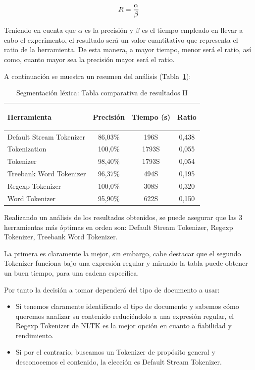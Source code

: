 \documentclass[runningheads,a4paper]{llncs}
\theoremstyle{break}
\newcommand{\rowstyle}[1]{\gdef\currentrowstyle{#1}%
  #1\ignorespaces
}
\begin{document}
\[\large R = \frac{\alpha}{\beta }\]

Teniendo en cuenta que $\alpha$ es la precisión y $\beta$ es el tiempo empleado en llevar a cabo el experimento, el resultado será un valor cuantitativo que representa el ratio de la herramienta. De esta manera, a mayor tiempo, menor será el ratio, así como, cuanto mayor sea la precisión mayor será el ratio.

A continuación se muestra un resumen del análisis (Tabla~\ref{tab:tok}):
\bgroup
\centering
\setlength{\tabcolsep}{12pt}
\def\arraystretch{1.5}
\begin{table}
\begin{center}
\begin{tabular}{p{5cm}| c |c|c}
\rowstyle{\bfseries}
Herramienta & \rowstyle{\bfseries} Precisión & \rowstyle{\bfseries} Tiempo (s) & \rowstyle{\bfseries} Ratio\\ \hline
Default Stream Tokenizer 	& 86,03\% 	&  196S  & 0,438 \\
Tokenization				& 100,0\%	&  1793S & 0,055 \\
Tokenizer  					& 98,40\%	&  1793S & 0,054 \\
Treebank Word Tokenizer     & 96,37\%   &  494S  & 0,195 \\
Regexp Tokenizer            & 100,0\%   &  308S  & 0,320 \\
Word Tokenizer              & 95,90\%	&  622S  & 0,150 \\ \hline
\end{tabular}
\end{center}
\vspace{1em}
\caption{Segmentación léxica: Tabla comparativa de resultados II \label{tab:tok}}
\end{table}
\egroup
\vspace{-1.5em}

Realizando un análisis de los resultados obtenidos, se puede asegurar que las 3 herramientas más óptimas en orden son: Default Stream Tokenizer, Regexp Tokenizer, Treebank Word Tokenizer.

La primera es claramente la mejor, sin embargo, cabe destacar que el segundo Tokenizer funciona bajo una expresión regular y mirando la tabla puede obtener un buen tiempo, para una cadena específica.

Por tanto la decisión a tomar dependerá del tipo de documento a usar:

\begin{itemize}
	\item Si tenemos claramente identificado el tipo de documento y sabemos cómo queremos analizar su contenido reduciéndolo a una expresión regular, el Regexp Tokenizer de NLTK es la mejor opción en cuanto a fiabilidad y rendimiento.
    \item Si por el contrario, buscamos un Tokenizer de propósito general y desconocemos el contenido, la elección es Default Stream Tokenizer. 
\end{itemize}
\end{document}
